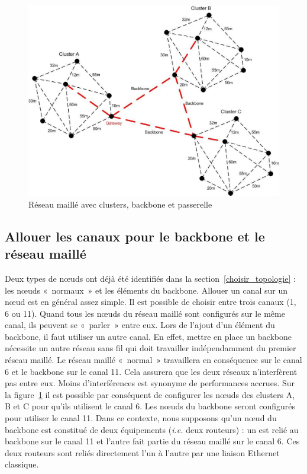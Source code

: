 \documentclass[a4paper,french,11pt,twoside]{article}
\begin{document}
\begin{figure}[!h]
\center
\includegraphics[scale=0.30]{figure4.jpeg}
\caption{Réseau maillé avec clusters, backbone et passerelle} %
\label{figure4}
\end{figure}

\subsection{\label{allouer_canaux_backbone}Allouer les canaux pour le backbone et le réseau maillé}

Deux types de nœuds ont déjà été identifiés dans la section~\ref{choisir_topologie} : les nœuds «~normaux~» et les éléments du backbone. Allouer un canal sur un nœud est en général assez simple. Il est possible de choisir entre trois canaux (1, 6 ou 11). Quand tous les nœuds du réseau maillé sont configurés sur le même canal, ils peuvent se «~parler~» entre eux. Lors de l'ajout d'un élément du backbone, il faut utiliser un autre canal. En effet, mettre en place un backbone nécessite un autre réseau sans fil qui doit travailler indépendamment du premier réseau maillé. Le réseau maillé «~normal~» travaillera en conséquence sur le canal 6 et le backbone sur le canal 11. Cela assurera que les deux réseaux n'interfèrent pas entre eux.  Moins d'interférences est synonyme de performances accrues. Sur la figure~\ref{figure4} il est possible par conséquent de configurer les nœuds des clusters A, B et C pour qu'ils utilisent le canal 6. Les nœuds du backbone seront configurés pour utiliser le canal 11. Dans ce contexte, nous supposons qu'un nœud du backbone est constitué de deux équipements (\textit{i.e.} deux routeurs) : un est relié au backbone sur le canal 11 et l'autre fait partie du réseau maillé sur le canal 6. Ces deux routeurs sont reliés directement l'un à l'autre par une liaison Ethernet classique.
\end{document}
